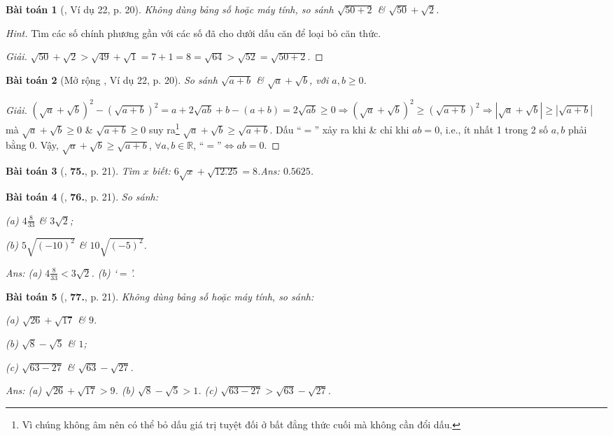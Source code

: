 \documentclass{article}
\numberwithin{equation}{section}
\newtheorem{baitoan}{Bài toán}
\begin{document}
\begin{baitoan}[\cite{Tuyen_Toan_7}, Ví dụ 22, p. 20]
	Không dùng bảng số hoặc máy tính, so sánh $\sqrt{50 + 2}$ \& $\sqrt{50} + \sqrt{2}$.
\end{baitoan}
\noindent\textit{Hint.} Tìm các số chính phương gần với các số đã cho dưới dấu căn để loại bỏ căn thức.

\begin{proof}[Giải]
	$\sqrt{50} + \sqrt{2} > \sqrt{49} + \sqrt{1} = 7 + 1 = 8 = \sqrt{64} > \sqrt{52} = \sqrt{50 + 2}$.
\end{proof}

\begin{baitoan}[Mở rộng \cite{Tuyen_Toan_7}, Ví dụ 22, p. 20]
	So sánh $\sqrt{a + b}$ \& $\sqrt{a} + \sqrt{b}$, với $a,b\ge 0$.
\end{baitoan}

\begin{proof}[Giải]
	$(\sqrt{a} + \sqrt{b})^2 - (\sqrt{a + b})^2 = a + 2\sqrt{ab} + b - (a + b) = 2\sqrt{ab}\ge 0\Rightarrow(\sqrt{a} + \sqrt{b})^2\ge(\sqrt{a + b})^2\Rightarrow|\sqrt{a} + \sqrt{b}|\ge|\sqrt{a + b}|$ mà $\sqrt{a} + \sqrt{b}\ge 0$ \& $\sqrt{a + b}\ge 0$ suy ra\footnote{Vì chúng không âm nên có thể bỏ dấu giá trị tuyệt đối ở bất đẳng thức cuối mà không cần đổi dấu.} $\sqrt{a} + \sqrt{b}\ge\sqrt{a + b}$. Dấu ``$=$'' xảy ra khi \& chỉ khi $ab = 0$, i.e., ít nhất 1 trong 2 số $a,b$ phải bằng $0$. Vậy, $\sqrt{a} + \sqrt{b}\ge\sqrt{a + b}$, $\forall a,b\in\mathbb{R}$, ``$=$''$\Leftrightarrow ab = 0$.
\end{proof}

\begin{baitoan}[\cite{Tuyen_Toan_7}, \textbf{75.}, p. 21]
	Tìm $x$ biết: $6\sqrt{x} + \sqrt{12.25} = 8$.\hfill\textsf{Ans:} $0.5625$.
\end{baitoan}

\begin{baitoan}[\cite{Tuyen_Toan_7}, \textbf{76.}, p. 21]
	So sánh:
	\begin{enumerate*}
		\item[(a)] $4\frac{8}{33}$ \& $3\sqrt{2}$;
		\item[(b)] $5\sqrt{(-10)^2}$ \& $10\sqrt{(-5)^2}$.
	\end{enumerate*}\hfill\textsf{Ans:} (a) $4\frac{8}{33} < 3\sqrt{2}$. (b) `$=$'.
\end{baitoan}

\begin{baitoan}[\cite{Tuyen_Toan_7}, \textbf{77.}, p. 21]
	Không dùng bảng số hoặc máy tính, so sánh:
	\begin{enumerate*}
		\item[(a)] $\sqrt{26} + \sqrt{17}$ \& $9$.
		\item[(b)] $\sqrt{8} - \sqrt{5}$ \& $1$;
		\item[(c)] $\sqrt{63 - 27}$ \& $\sqrt{63} - \sqrt{27}$.
	\end{enumerate*}\hfill\textsf{Ans:} (a) $\sqrt{26} + \sqrt{17} > 9$. (b) $\sqrt{8} - \sqrt{5} > 1$. (c) $\sqrt{63 - 27} > \sqrt{63} - \sqrt{27}$.
\end{baitoan}
\end{document}
